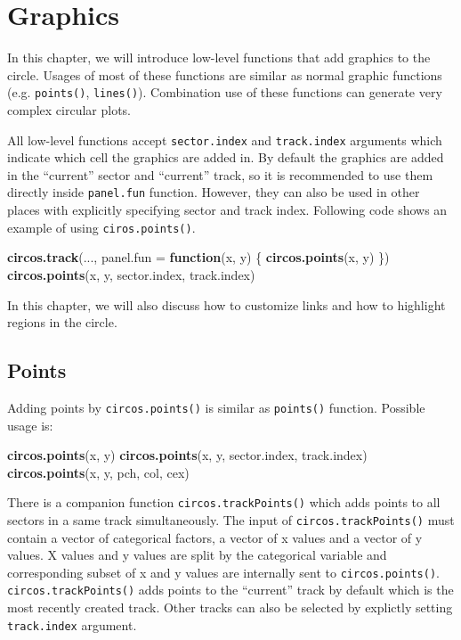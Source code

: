 \documentclass[]{book}
\newenvironment{Shaded}{\begin{snugshade}}{\end{snugshade}}
\newcommand{\KeywordTok}[1]{\textcolor[rgb]{0.13,0.29,0.53}{\textbf{#1}}}
\newcommand{\DataTypeTok}[1]{\textcolor[rgb]{0.13,0.29,0.53}{#1}}
\newcommand{\ControlFlowTok}[1]{\textcolor[rgb]{0.13,0.29,0.53}{\textbf{#1}}}
\newcommand{\NormalTok}[1]{#1}
\theoremstyle{definition}
\theoremstyle{definition}
\theoremstyle{remark}
\begin{document}
\chapter{Graphics}\label{graphics}

In this chapter, we will introduce low-level functions that add graphics
to the circle. Usages of most of these functions are similar as normal
graphic functions (e.g. \texttt{points()}, \texttt{lines()}).
Combination use of these functions can generate very complex circular
plots.

All low-level functions accept \texttt{sector.index} and
\texttt{track.index} arguments which indicate which cell the graphics
are added in. By default the graphics are added in the ``current''
sector and ``current'' track, so it is recommended to use them directly
inside \texttt{panel.fun} function. However, they can also be used in
other places with explicitly specifying sector and track index.
Following code shows an example of using \texttt{ciros.points()}.

\begin{Shaded}
\begin{Highlighting}[]
\KeywordTok{circos.track}\NormalTok{(..., }\DataTypeTok{panel.fun =} \ControlFlowTok{function}\NormalTok{(x, y) \{}
    \KeywordTok{circos.points}\NormalTok{(x, y)}
\NormalTok{\})}
\KeywordTok{circos.points}\NormalTok{(x, y, sector.index, track.index)}
\end{Highlighting}
\end{Shaded}

In this chapter, we will also discuss how to customize links and how to
highlight regions in the circle.

\section{Points}\label{points}

Adding points by \texttt{circos.points()} is similar as
\texttt{points()} function. Possible usage is:

\begin{Shaded}
\begin{Highlighting}[]
\KeywordTok{circos.points}\NormalTok{(x, y)}
\KeywordTok{circos.points}\NormalTok{(x, y, sector.index, track.index)}
\KeywordTok{circos.points}\NormalTok{(x, y, pch, col, cex)}
\end{Highlighting}
\end{Shaded}

There is a companion function \texttt{circos.trackPoints()} which adds
points to all sectors in a same track simultaneously. The input of
\texttt{circos.trackPoints()} must contain a vector of categorical
factors, a vector of x values and a vector of y values. X values and y
values are split by the categorical variable and corresponding subset of
x and y values are internally sent to \texttt{circos.points()}.
\texttt{circos.trackPoints()} adds points to the ``current'' track by
default which is the most recently created track. Other tracks can also
be selected by explictly setting \texttt{track.index} argument.
\end{document}
